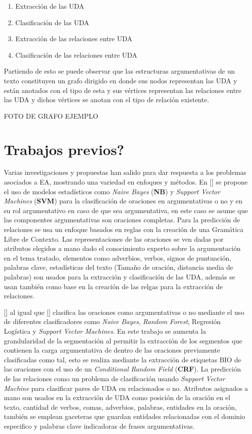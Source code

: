 \begin{enumerate}
    \item Extracción de las UDA
    \item Clasificación de las UDA
    \item Extracción de las relaciones entre UDA
    \item Clasificación de las relaciones entre UDA
\end{enumerate}

Partiendo de esto se puede observar que las estructuras argumentativas de un texto constituyen un grafo dirigido 
en donde sus nodos representan las UDA y están anotados con el tipo de esta y sus vértices representan las 
relaciones entre las UDA y dichos vértices se anotan con el tipo de relación existente.

FOTO DE GRAFO EJEMPLO

\section{Trabajos previos?}

Varias investigaciones y propuestas han salido para dar respuesta a los problemas asociados a EA, mostrando
una variedad en enfoques y métodos.
En [\cite{palau2009argumentation}] se propone
el uso de modelos estadísticos como \emph{Naive Bayes} (\textbf{NB}) y \emph{Support Vector Machines} (\textbf{SVM}) 
para la clasificación de 
oraciones en argumentativas o no y en su rol argumentativo en caso de que sea argumentativa, en este
caso se asume que las componentes argumentativas son oraciones completas. Para la predicción de relaciones
se usa un enfoque basados en reglas con la creación de una Gramática Libre de Contexto. Las representaciones
de las oraciones se ven dadas por atributos elegidos a mano dado el conocimiento experto sobre la argumentación
en el tema tratado, elementos como adverbios, verbos, signos de puntuación, palabras clave, estadísticas del texto
(Tamaño de oración, distancia media de palabras) son usados para la extracción y clasificación de las UDA, además
se usan también como base en la creación de las relgas para la extracción de relaciones.

[\cite{goudas2015argument}] al igual que [\cite{palau2009argumentation}] clasifica las oraciones como
argumentativas o no mediante el uso de diferentes clasificadores como \emph{Naive Bayes}, \emph{Random Forest}, Regresión
Logística y \emph{Support Vector Machines}. En este trabajo se aumenta la grandularidad de la segmentación al permitir
la extracción de los segmentos que contienen la carga argumentativa de dentro de las oraciones previamente clasificadas
como tal, esto se realiza mediante la extracción de etiquetas BIO de las oraciones con el uso de un 
\emph{Conditional Random Field} (\textbf{CRF}). La predicción de las relaciones como un problema de clasificación
usando \emph{Support Vector Machine} para clasificar pares de UDA en relacionados o no. Atributos asignados a mano 
son usados en la extracción de UDA como posición de la oración en el texto, cantidad de verbos, comas, adverbios,
palabras, entidades en la oración, también se emplean gaceteras que guardan entidades relacionadas con el dominio 
especifico y palabras clave indicadoras de frases argumentativas. 

